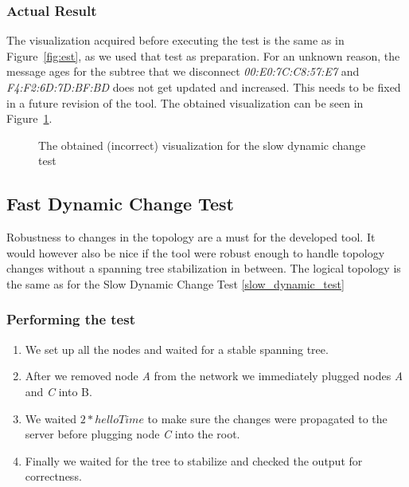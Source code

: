 \subsubsection*{Actual Result}
The visualization acquired before executing the test is the same as in Figure~\ref{fig:est}, as we used that test as preparation.
For an unknown reason, the message ages for the subtree that we disconnect \textit{00:E0:7C:C8:57:E7} and \textit{F4:F2:6D:7D:BF:BD} does not get updated and increased.
This needs to be fixed in a future revision of the tool.
The obtained visualization can be seen in Figure~\ref{fig:dynAfter}.
\begin{figure}[h]
    \centering
    \caption{The obtained (incorrect) visualization for the slow dynamic change test}
    \label{fig:dynAfter}
\end{figure}

\subsection*{Fast Dynamic Change Test}
\label{fast_dynamic_test}
Robustness to changes in the topology are a must for the developed tool.
It would however also be nice if the tool were robust enough to handle topology changes without a spanning tree stabilization in between.
The logical topology is the same as for the Slow Dynamic Change Test \ref{slow_dynamic_test}

\subsubsection*{Performing the test}
\begin{enumerate}
    \item We set up all the nodes and waited for a stable spanning tree.
    \item After we removed node \textit{A} from the network we immediately plugged nodes \textit{A} and \textit{C} into B.
    \item We waited $2*helloTime$ to make sure the changes were propagated to the server before plugging node \textit{C} into the root.
    \item Finally we waited for the tree to stabilize and checked the output for correctness.
\end{enumerate}

